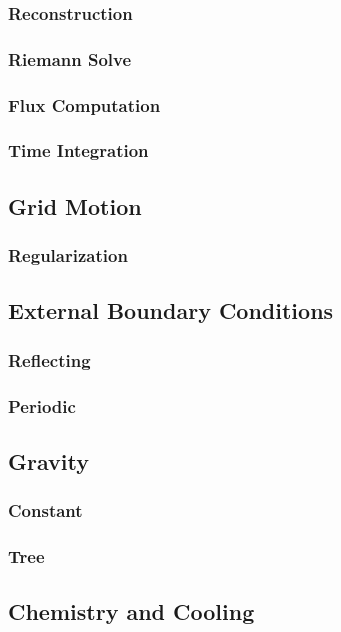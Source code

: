 \subsubsection{Reconstruction}
\subsubsection{Riemann Solve}
\subsubsection{Flux Computation}
\subsubsection{Time Integration}

\subsection{Grid Motion}
\subsubsection{Regularization}

\subsection{External Boundary Conditions}
\subsubsection{Reflecting}
\subsubsection{Periodic}

\subsection{Gravity}
\subsubsection{Constant}
\subsubsection{Tree}

\subsection{Chemistry and Cooling}
